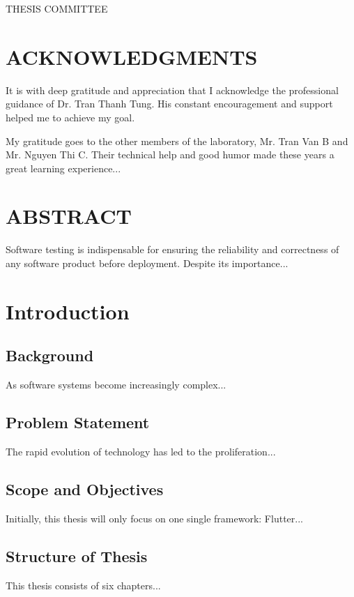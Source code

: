 \documentclass[12pt,a4paper]{report}
\begin{document}
\vfill
\noindent THESIS COMMITTEE

\chapter*{ACKNOWLEDGMENTS}
It is with deep gratitude and appreciation that I acknowledge the professional guidance of Dr. Tran Thanh Tung. His constant encouragement and support helped me to achieve my goal.

My gratitude goes to the other members of the laboratory, Mr. Tran Van B and Mr. Nguyen Thi C. Their technical help and good humor made these years a great learning experience...

\tableofcontents
\listoffigures
\listoftables

\chapter*{ABSTRACT}
Software testing is indispensable for ensuring the reliability and correctness of any software product before deployment. Despite its importance...

\chapter{Introduction}
\section{Background}
As software systems become increasingly complex...

\section{Problem Statement}
The rapid evolution of technology has led to the proliferation...

\section{Scope and Objectives}
Initially, this thesis will only focus on one single framework: Flutter...

\section{Structure of Thesis}
This thesis consists of six chapters...
\end{document}
